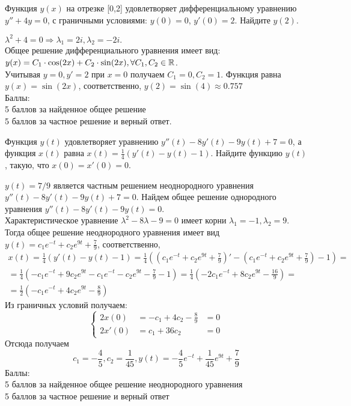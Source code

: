 \documentclass[addpoints, answers]{exam} %
\begin{document}
\begin{questions}
\begin{parts}
\begin{solution}
\end{solution}
\end{parts}
\question[10] Функция $y(x)$ на отрезке [0,2] удовлетворяет дифференциальному уравнению $y''+4y=0$, с граничными условиями: $y(0)=0$, $y'(0)=2$. Найдите $y(2)$.\\

\begin{solution}
$\lambda^2+4=0 \Rightarrow \lambda_1=2i, \lambda_2=-2i.$ \\
Общее решение дифференциального уравнения имеет вид: $y(x)=C_1\cdot \cos(2x)+C_2\cdot \sin(2x), \forall C_1,C_2 \in \mathbb R$.\\
Учитывая $y=0, y'=2$ при $x=0$ получаем $C_1=0, C_2=1$. Функция равна $y(x)=\sin(2x)$, соответственно, $y(2)=\sin(4)\approx 0.757$\\
Баллы:\\
5 баллов за найденное общее решение\\
5 баллов за частное решение и верный ответ.
\end{solution}

\question[10] Функция $y(t)$ удовлетворяет уравнению $y''(t)-8y'(t)-9y(t)+7=0$, а функция $x(t)$ равна $x(t)=\frac{1}{4}(y'(t)-y(t)-1)$. Найдите функцию  $y(t)$, такую, что $x(0)=x'(0)=0$.\\

\begin{solution}
$y(t)=7/9$ является частным решением неоднородного уравнения $y''(t)-8y'(t)-9y(t)+7=0$. Найдем общее решение однородного уравнения $y''(t)-8y'(t)-9y(t)=0$.\\
Характеристическое уравнение $\lambda^2-8\lambda-9=0$ имеет корни $\lambda_1=-1, \lambda_2=9$. Тогда общее решение неоднородного уравнения имеет вид $y(t)=c_1e^{-t}+c_2e^{9t}+\frac{7}{9}$, соответственно,
\begin{multline*}
x(t)=\frac{1}{4}(y'(t)-y(t)-1)=\frac{1}{4}\left((c_1e^{-t}+c_2e^{9t}+\frac{7}{9})'-(c_1e^{-t}+c_2e^{9t}+\frac{7}{9})-1\right)= \\
= \frac{1}{4}\left(-c_1e^{-t}+9c_2e^{9t}-c_1e^{-t}-c_2e^{9t}-\frac{7}{9}-1\right)=\frac{1}{4}\left(-2c_1e^{-t}+8c_2e^{9t}-\frac{16}{9}\right)=\\
=\frac{1}{2}\left(-c_1e^{-t}+4c_2e^{9t}-\frac{8}{9}\right)
\end{multline*}
Из граничных условий получаем:
\[\left\{\begin{aligned}
2x(0) &=-c_1+4c_2-\frac{8}{9}&=0\\
2x'(0)&=c_1+36c_2 &=0
\end{aligned}\right.\]
Отсюда получаем
\[
c_1=-\frac{4}{5}, c_2=\frac{1}{45}, y(t)=-\frac{4}{5}e^{-t}+\frac{1}{45}e^{9t}+\frac{7}{9}
\]
Баллы:\\
5 баллов за найденное общее решение неоднородного уравнения\\
5 баллов за частное решение и верный ответ
\end{solution}


\end{questions}
\end{document}
